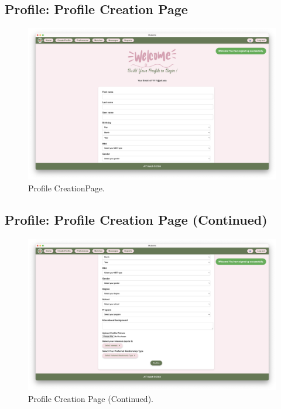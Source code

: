         \subsection{Profile: Profile Creation Page}
        \begin{figure}[h]
                \centering
                \captionsetup{justification=centering, singlelinecheck=false, labelsep=space}
                \includegraphics[width=5in]{figures/results/profiles/create-profile-page.png} 
                \caption{Profile CreationPage.}
                \label{fig:create-profile-page}
            \end{figure}

        \subsection{Profile: Profile Creation Page (Continued)}
        \begin{figure}[h]
                \centering
                \captionsetup{justification=centering, singlelinecheck=false, labelsep=space}
                \includegraphics[width=5in]{figures/results/profiles/create-profile-page2.png} 
                \caption{Profile Creation Page (Continued).}
                \label{fig:create-profile-page2}
            \end{figure}

